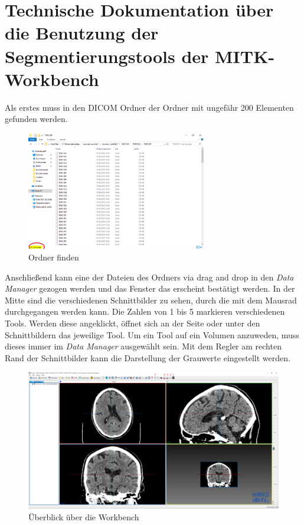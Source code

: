 
\Appendix
\label{ch:Appendix}



\section{Technische Dokumentation über die Benutzung der Segmentierungstools der MITK-Workbench}

Als erstes muss in den DICOM Ordner der Ordner mit ungefähr 200 Elementen gefunden werden.

\begin{figure}[H] 
\centering 
\includegraphics[width=0.7\textwidth]{Logos/MITK_Doku/1.PNG}
\caption{Ordner finden} 
\label{fig:eins} 
\end{figure}

Anschließend kann eine der Dateien des Ordners via drag and drop in den \textit{Data Manager} gezogen werden und das Fenster das erscheint bestätigt werden.
\newline
In der Mitte sind die verschiedenen Schnittbilder zu sehen, durch die mit dem Mausrad durchgegangen werden kann.
\newline
Die Zahlen von 1 bis 5 markieren verschiedenen Tools. Werden diese angeklickt, öffnet sich an der Seite oder unter den Schnittbildern das jeweilige Tool. Um ein Tool auf ein Volumen anzuweden, muss dieses immer im \textit{Data Manager} ausgewählt sein.
\newline
Mit dem Regler am rechten Rand der Schnittbilder kann die Darstellung der Grauwerte eingestellt werden.

\begin{figure}[H] 
\centering 
\includegraphics[width=\textwidth]{Logos/MITK_Doku/2.PNG}
\caption{Überblick über die Workbench} 
\label{fig:zwei} 
\end{figure}

